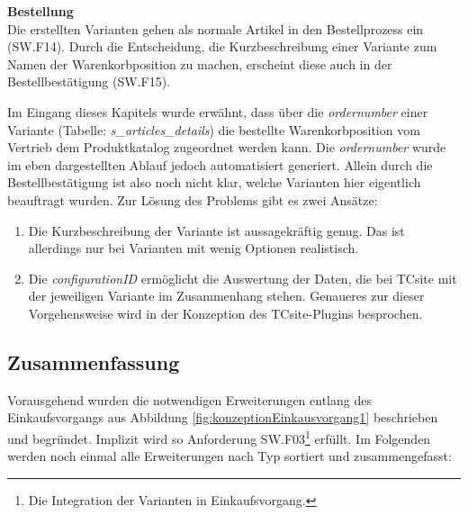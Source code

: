 \documentclass[11pt, a4paper, titlepage, listof=totoc, bibliography=totoc, index=totoc, twoside, openright, headings=normal]{scrreprt}
\begin{document}
\textbf{Bestellung}\\
Die erstellten Varianten gehen als normale Artikel in den Bestellprozess ein (SW.F14). Durch die Entscheidung, die Kurzbeschreibung einer Variante zum Namen der Warenkorbposition zu machen, erscheint diese auch in der Bestellbestätigung (SW.F15).

Im Eingang dieses Kapitels wurde erwähnt, dass über die \emph{ordernumber} einer Variante (Tabelle: \emph{s\_articles\_details}) die bestellte Warenkorbposition vom Vertrieb dem Produktkatalog zugeordnet werden kann. Die \emph{ordernumber} wurde im eben dargestellten Ablauf jedoch automatisiert generiert. Allein durch die Bestellbestätigung ist also noch nicht klar, welche Varianten hier eigentlich beauftragt wurden. Zur Lösung des Problems gibt es zwei Ansätze:
\begin{enumerate}
\item Die Kurzbeschreibung der Variante ist aussagekräftig genug. Das ist allerdings nur bei Varianten mit wenig Optionen realistisch.
\item Die \emph{configurationID} ermöglicht die Auswertung der Daten, die bei TCsite mit der jeweiligen Variante im Zusammenhang stehen. Genaueres zur dieser Vorgehensweise wird in der Konzeption des TCsite-Plugins besprochen.
\end{enumerate}

\subsection{Zusammenfassung}
Vorausgehend wurden die notwendigen Erweiterungen entlang des Einkaufsvorgangs aus Abbildung \ref{fig:konzeptionEinkausvorgang1} beschrieben und begründet. Implizit wird so Anforderung SW.F03\footnote{Die Integration der Varianten in Einkaufsvorgang.} erfüllt. Im Folgenden werden noch einmal alle Erweiterungen nach Typ sortiert und zusammengefasst:
 
\end{document}
